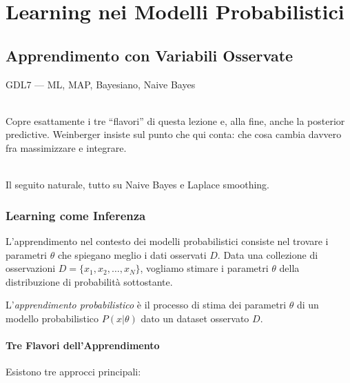 \part{Learning nei Modelli Probabilistici}

\chapter{Apprendimento con Variabili Osservate}

\begin{risorsevideo}{GDL7 — ML, MAP, Bayesiano, Naive Bayes}

\medskip
{}\\
Copre esattamente i tre ``flavori'' di questa lezione e, alla fine, anche la posterior predictive. Weinberger insiste sul punto che qui conta: che cosa cambia davvero fra massimizzare e integrare.

\medskip
{}\\
Il seguito naturale, tutto su Naive Bayes e Laplace smoothing.
\end{risorsevideo}

\section{Learning come Inferenza}

L'apprendimento nel contesto dei modelli probabilistici consiste nel trovare i parametri $\theta$ che spiegano meglio i dati osservati $D$. Data una collezione di osservazioni $D = \{x_1, x_2, \ldots, x_N\}$, vogliamo stimare i parametri $\theta$ della distribuzione di probabilità sottostante.

\begin{definition}
  L'\textit{apprendimento probabilistico} è il processo di stima dei parametri $\theta$ di un modello probabilistico $P(x|\theta)$ dato un dataset osservato $D$.
\end{definition}

\subsection{Tre Flavori dell'Apprendimento}

Esistono tre approcci principali:

